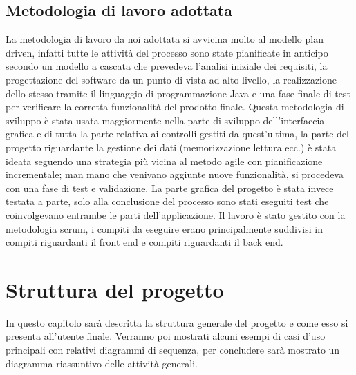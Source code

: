 \documentclass[ 4paper,11pt,openany]{book}
\begin{document}
 \section{Metodologia di lavoro adottata}
La metodologia di lavoro da noi adottata si avvicina molto al modello plan driven, infatti tutte le attività del processo sono state pianificate in anticipo secondo un modello a cascata che prevedeva l'analisi iniziale dei requisiti, la progettazione del software da un punto di vista ad alto livello,
la realizzazione dello stesso tramite il linguaggio di programmazione Java e una fase finale di test per verificare la corretta funzionalità del prodotto finale.
Questa metodologia di sviluppo è stata usata maggiormente nella parte di sviluppo dell'interfaccia grafica e di tutta la parte relativa ai controlli gestiti da quest'ultima, la parte del progetto riguardante la gestione dei dati (memorizzazione lettura ecc.) è stata ideata seguendo una strategia più vicina al metodo agile con pianificazione incrementale; man mano che venivano aggiunte nuove funzionalità, si procedeva con una fase di test e validazione. La parte grafica del progetto è stata invece testata a parte, solo alla conclusione del processo sono stati eseguiti test che coinvolgevano entrambe le parti dell'applicazione. Il lavoro è stato gestito con la metodologia scrum, i compiti da eseguire erano principalmente suddivisi in compiti riguardanti il front end e compiti riguardanti il back end.

\chapter{Struttura del progetto}
In questo capitolo sarà descritta la struttura generale del progetto e come esso si presenta all'utente finale. Verranno poi mostrati alcuni esempi di casi d'uso principali con relativi diagrammi di sequenza, per concludere sarà mostrato un diagramma riassuntivo delle attività generali.
\end{document}
